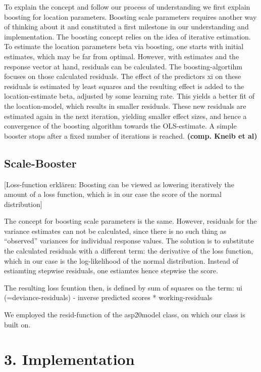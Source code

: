 \documentclass[
]{report}
\begin{document}
To explain the concept and follow our process of understanding we first
explain boosting for location parameters. Boosting scale parameters
requires another way of thinking about it and constituted a first
milestone in our understanding and implementation. The boosting concept
relies on the idea of iterative estimation. To estimate the location
parameters beta via boosting, one starts with initial estimates, which
may be far from optimal. However, with estimates and the response vector
at hand, residuals can be calculated. The boosting-algortihm focuses on
those calculated residuals. The effect of the predictors xi on these
residuals is estimated by least squares and the resulting effect is
added to the location-estimate beta, adjusted by some learning rate.
This yields a better fit of the location-model, which results in smaller
residuals. These new residuals are estimated again in the next
iteration, yielding smaller effect sizes, and hence a convergence of the
boosting algorithm towards the OLS-estimate. A simple booster stops
after a fixed number of iterations is reached. \textbf{(comp. Kneib et
al)}

\hypertarget{scale-booster}{%
\section{Scale-Booster}\label{scale-booster}}

{[}Loss-function erklären: Boosting can be viewed as lowering
iteratively the amount of a loss function, which is in our case the
score of the normal distribution{]}

The concept for boosting scale parameters is the same. However,
residuals for the variance estimates can not be calculated, since there
is no such thing as ``observed'' variances for individual response
values. The solution is to substitute the calculated residuals with a
different term: the derivative of the loss function, which in our case
is the log-likelihood of the normal distribution. Instead of estiamting
stepwise residuals, one estiamtes hence stepwise the score.

The resulting loss fcuntion then, is defined by sum of squares oa the
term: ui (=deviance-residuals) - inverse predicted scores *
working-residuals

We employed the resid-function of the asp20model class, on which our
class is built on.

\hypertarget{implementation}{%
\chapter{3. Implementation}\label{implementation}}
\end{document}
